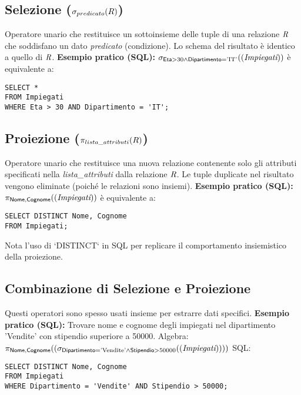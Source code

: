 	\subsection{Selezione ($\sigma_{predicato}(R)$)}
	Operatore unario che restituisce un sottoinsieme delle tuple di una relazione $\textit{R}$ che soddisfano un dato \textit{predicato} (condizione).
	Lo schema del risultato è identico a quello di $\textit{R}$.
	\textbf{Esempio pratico (SQL):}
	$\sigma_{\textsf{Eta} > 30 \wedge \textsf{Dipartimento} = \text{'IT'}}((\textit{Impiegati}))$
	è equivalente a:
	\begin{verbatim}
SELECT *
FROM Impiegati
WHERE Eta > 30 AND Dipartimento = 'IT';
	\end{verbatim}
	
	\subsection{Proiezione ($\pi_{lista\_attributi}(R)$)}
	Operatore unario che restituisce una nuova relazione contenente solo gli attributi specificati nella \textit{lista\_attributi} dalla relazione $\textit{R}$.
	Le tuple duplicate nel risultato vengono eliminate (poiché le relazioni sono insiemi).
	\textbf{Esempio pratico (SQL):}
	$\pi_{\textsf{Nome}, \textsf{Cognome}}((\textit{Impiegati}))$
	è equivalente a:
	\begin{verbatim}
SELECT DISTINCT Nome, Cognome
FROM Impiegati;
	\end{verbatim}
	Nota l'uso di `DISTINCT` in SQL per replicare il comportamento insiemistico della proiezione.
	
	\subsection{Combinazione di Selezione e Proiezione}
	Questi operatori sono spesso usati insieme per estrarre dati specifici.
	\textbf{Esempio pratico (SQL):} Trovare nome e cognome degli impiegati nel dipartimento 'Vendite' con stipendio superiore a 50000.
	Algebra: $\pi_{\textsf{Nome}, \textsf{Cognome}}((\sigma_{\textsf{Dipartimento} = \text{'Vendite'} \wedge \textsf{Stipendio} > 50000}((\textit{Impiegati}))))$
	SQL:
	\begin{verbatim}
SELECT DISTINCT Nome, Cognome
FROM Impiegati
WHERE Dipartimento = 'Vendite' AND Stipendio > 50000;
	\end{verbatim}
	
